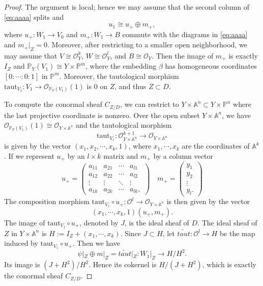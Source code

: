\documentclass{amsart}
\numberwithin{equation}{section}
\newcommand\mc{\mathcal}
\newcommand\mb{\mathbb}
\newcommand{\taut}{\mathrm{taut}}
\theoremstyle{definition}
\theoremstyle{remark}
\begin{document}
\begin{proof}
The argument is local; hence we may assume that the second column of \cref{eq:aaaa} splits and 
\begin{equation*}
  u_1\cong u_+\oplus m_+,
\end{equation*}
where $u_+:W_1\to V_0$ and $m_+:W_1\to B$ commute with the diagrams in \cref{eq:aaaa} and $m_+|_{Z}=0$. 
Moreover, after restricting to a smaller open neighborhood, we may assume that $V\cong \mc{O}_Y^k$, $W\cong \mc{O}_Y^l$, and $B\cong \mc{O}_Y$. Then the image of $m_+$ is exactly $I_Z$ and
$\mb{P}_Y(V_1)\cong Y\times \mb{P}^{m}$, where the embedding $\beta$ has homogeneous coordinates $[0:\cdots:0:1]$ in $\mb{P}^m$. Moreover, the tautological morphism $\taut_{V_1}:V_1\to \mc{O}_{\mb{P}_Y(V_1)}(1)$ is $0$ on $Z$, and thus $Z\subset D$. 

To compute the conormal sheaf $C_{Z/D}$, we can restrict to $Y\times \mb{A}^n\subset Y\times \mb{P}^n$ where the last projective coordinate is nonzero. Over the open subset $Y\times \mb{A}^n$, we have
$\mc{O}_{\mb{P}_Y(V_1)}(1)\cong \mc{O}_{Y\times \mb{A}^n}$ and the tautological morphism 
\begin{equation*}
  \taut_{V_1}:\mc{O}_{Y\times \mb{A}^n}^{k+1}\to \mc{O}_{Y\times \mb{A}^n}
\end{equation*}
is given by the vector $(x_1,x_2,\cdots,x_k,1)$, where $x_1,\cdots,x_k$ are the coordinates of $\mb{A}^k$. 
If we represent $u_+$ by an $l\times k$ matrix and $m_+$ by a column vector
\begin{equation*}
  u_+=\begin{pmatrix}
    a_{11} & a_{21} & \cdots & a_{l1} \\
    a_{12} & a_{22} & \cdots & a_{l2} \\
    \vdots & \vdots & \ddots & \vdots \\
    a_{1k} & a_{2k} & \cdots & a_{lk},
  \end{pmatrix}\quad
  m_+=\begin{pmatrix}
    y_1 \\
    y_2 \\
    \vdots \\
    y_l.
  \end{pmatrix}
\end{equation*}
The composition morphism $\taut_{V_1}\circ u_+:\mc{O}^l\to \mc{O}_{Y\times \mb{A}^n}$ is then given by the vector
\begin{equation*}
  (x_1,\cdots,x_k,1)(u_+,m_+).
\end{equation*}
The image of $\taut_{V_1}\circ u_+$, denoted by $J$, is the ideal sheaf of $D$. The ideal sheaf of $Z$ in $Y\times \mb{A}^{n}$ is $H:=I_Z+(x_1,\cdots,x_k)$. Since $J\subset H$, let $\widetilde{taut}:\mc{O}^l\to H$ be the map induced by $\taut_{V_1}\circ u_+$. Then we have 
\begin{equation*}
  \psi|_Z\oplus m|_Z=\widetilde{taut}|_Z:W_1|_Z\to H/H^2.
\end{equation*}
Its image is $(J+H^2)/H^2$. Hence its cokernel is $H/(J+H^2)$, which is exactly the conormal sheaf $C_{Z/D}$.
\end{proof}
\end{document}
